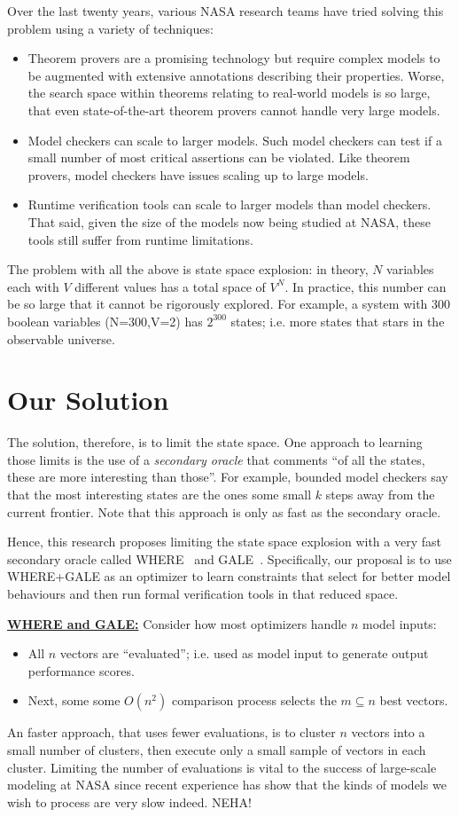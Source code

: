 \documentclass[12pt]{article}
\newcommand{\bi}{\begin{itemize}[leftmargin=0.5cm]}
\newcommand{\ei}{\end{itemize}}
\begin{document}
Over the last twenty years, various
NASA research teams have tried solving this problem using a variety of techniques:
\bi
\item Theorem provers are a promising technology but require complex models to be augmented with extensive annotations describing their properties. Worse, the search space within theorems relating to real-world models is so large, that even state-of-the-art theorem provers cannot handle very large models.
\item Model checkers can scale to larger models. Such model checkers can test if a small number of most critical assertions can be violated. Like theorem provers, model checkers
have issues scaling up to large models.
\item Runtime verification tools can scale to larger models than model checkers. That
said, given the size of the models now being studied at NASA, these tools still suffer
from runtime limitations.
\ei
The problem with all the above is   state space explosion: in theory,
$N$ variables each with $V$ different values has a total space of $V^N$. In practice,
this number can be so large that it cannot be rigorously explored. For example, a system 
with 300 boolean variables (N=300,V=2) has $2^300$ states; i.e. more states that stars in the observable universe.

\section{Our Solution}

The solution, therefore, is to limit the state space. One approach to learning those limits
is the use of a {\em secondary oracle} that comments ``of all the states, these are more interesting than those''. For example, bounded model checkers say that the most interesting states are the ones some small $k$ steps away from the current frontier. Note that this approach is only as fast  as the secondary oracle.

Hence, this research proposes limiting the state space explosion with a very fast secondary oracle called WHERE~\cite{me12d} and GALE~\cite{krall2015gale}. 
Specifically, 
our proposal is to use WHERE+GALE as an optimizer to learn constraints that select for better model behaviours and then run formal verification tools in that reduced space.

\underline{{\bf WHERE and GALE:}} 
Consider 
how most optimizers handle  $n$ model inputs:
\bi
\item
 All $n$ vectors are ``evaluated''; i.e. used as model input to
 generate   output performance scores. 
\item
Next, some   some $O(n^2)$ comparison process  selects the $m \subseteq n$ best vectors.
\ei
An faster approach, that uses fewer evaluations, is to cluster $n$ vectors
into a small number of clusters, then
 execute only a small sample of vectors in each cluster.
 Limiting the number of evaluations is vital to the success of large-scale modeling
 at NASA since recent experience has show that the kinds of models we wish to process
 are very slow indeed. NEHA!
 
\end{document}
